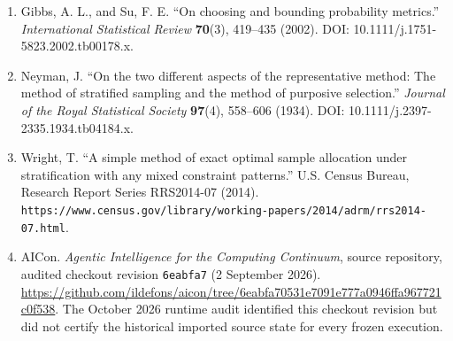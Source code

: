 \documentclass[10pt,a4paper]{article}
\begin{document}
\begin{enumerate}
\item Gibbs, A. L., and Su, F. E. “On choosing and bounding probability metrics.” \emph{International Statistical Review} \textbf{70}(3), 419–435 (2002). DOI: 10.1111/j.1751-5823.2002.tb00178.x.
\item Neyman, J. “On the two different aspects of the representative method: The method of stratified sampling and the method of purposive selection.” \emph{Journal of the Royal Statistical Society} \textbf{97}(4), 558–606 (1934). DOI: 10.1111/j.2397-2335.1934.tb04184.x.
\item Wright, T. “A simple method of exact optimal sample allocation under stratification with any mixed constraint patterns.” U.S. Census Bureau, Research Report Series RRS2014-07 (2014). \texttt{https://www.census.gov/library/working-papers/2014/adrm/rrs2014-07.html}.
\item AICon. \emph{Agentic Intelligence for the Computing Continuum}, source repository, audited checkout revision \texttt{6eabfa7} (2 September 2026). \url{https://github.com/ildefons/aicon/tree/6eabfa70531e7091e777a0946ffa967721c0f538}. The October 2026 runtime audit identified this checkout revision but did not certify the historical imported source state for every frozen execution.

\end{enumerate}
\end{document}
